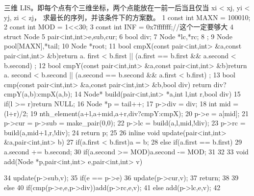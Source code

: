 \documentclass[11pt]{article}
\begin{document}
\begin{Code}
     三维 LIS。即每个点有个三维坐标，两个点能放在一前一后当且仅当 xi < xj, yi < yj, zi < zj，
     求最长的序列，并该条件下的方案数。
 1   const int MAXN = 100010;
 2   const int MOD = 1<<30;
 3   const int INF = 0x7fffffff;//这个一定要够大
 4   struct Node{
 5       pair<int,int>e,sub,cur;
 6       bool div;
 7       Node *lc,*rc;
 8   };
 9   Node pool[MAXN],*tail;
10   Node *root;
11   bool cmpX(const pair<int,int> &a,const pair<int,int> &b){return a.
        first < b.first || (a.first == b.first && a.second < b.second)
        ;}
12   bool cmpY(const pair<int,int> &a,const pair<int,int> &b){return a.
        second < b.second || (a.second == b.second && a.first < b.first)
        ;}
13   bool cmp(const pair<int,int> &a,const pair<int,int> &b,bool div){
        return div?cmpY(a,b):cmpX(a,b);}
14   Node* build(pair<int,int> *a,int l,int r,bool div){
15       if(l >= r)return NULL;
16       Node *p = tail++;
17       p->div = div;
18       int mid = (l+r)/2;
19       nth_element(a+l,a+mid,a+r,div?cmpY:cmpX);
20       p->e = a[mid];
21       p->cur = p->sub = make_pair(0,0);
22       p->lc = build(a,l,mid,!div);
23       p->rc = build(a,mid+1,r,!div);
24       return p;
25   }
26   inline void update(pair<int,int> &a,pair<int,int> b){
27       if(a.first < b.first)a = b;
28       else if(a.first == b.first){
29           a.second += b.second;
30           if(a.second >= MOD)a.second -= MOD;
31       }
32   }
33   void add(Node *p,pair<int,int> e,pair<int,int> v){
34       update(p->sub,v);
35       if(e == p->e){
36           update(p->cur,v);
37           return;
38       }
39       else {
40           if(cmp(p->e,e,p->div))add(p->rc,e,v);
41           else add(p->lc,e,v);
42       }


}
\end{Code}
\end{document}
